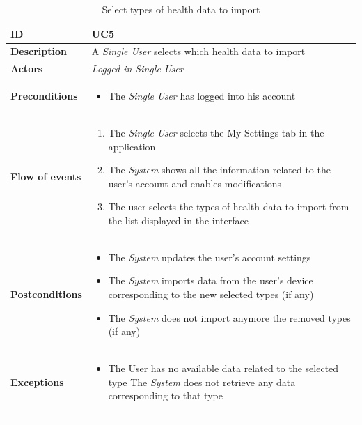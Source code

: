 \documentclass[titlepage]{article}
\begin{document}
\begin{longtable}{| p{3 cm} | p{10 cm} |} 
			\hline
			{\bf ID} & UC5 \\
			\hline
			{\bf Description} & A {\it Single User} selects which health data to import\\
			\hline
			{\bf Actors} & {\it Logged-in {\it Single User}} \\
			\hline
			{\bf Preconditions} & 		
							\begin{itemize}
								\item The {\it Single User}  has  logged into his account 
							\end{itemize}
			\\
			\hline
			{\bf Flow of events} & 
							\begin{enumerate}
								\item The {\it Single User} selects the My Settings tab in the application
\item The {\it System} shows all the information related to the user’s account and enables modifications
\item The user selects the types of health data to import from the list displayed in the interface
							\end{enumerate}
			
			 \\
			\hline
			{\bf Postconditions} & 
							\begin{itemize}
								\item The {\it System} updates the user’s account settings 
\item The {\it System} imports data from the user’s device corresponding to the new selected types (if any)
\item The {\it System} does not import anymore the removed types (if any)

							\end{itemize}
			\\
			\hline
			{\bf Exceptions} & 
							\begin{itemize}
								\item The User has no available data related to the selected type
The {\it System} does not retrieve any data corresponding to that type

							\end{itemize}
							
			\\
			\hline
			\caption{Select types of health data to import}
			\end{longtable}
\end{document}
